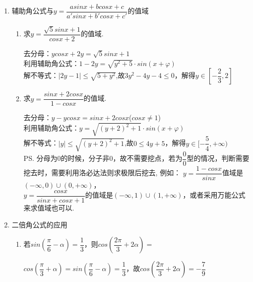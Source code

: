 \begin{enumerate}
\begin{enumerate}
\begin{jieda}
            $\Longrightarrow \dfrac{2m-3}{4-m} \in [-1, 1] 
            \Longrightarrow \left |\dfrac{2m-3}{4-m} \right| \leq 1 
            \Longrightarrow |2m-3| \leq |4-m| \Longrightarrow 4m^2 - 12m + 9 \leq 16 + m^2 - 8m \Longrightarrow 3m^2 -4m - 7 \leq 0 \Longrightarrow m \in \left[-1, \dfrac{7}{3}\right]$
        \end{jieda}
    \end{enumerate}
    \item 辅助角公式与$y = \dfrac{asinx+bcosx+c}{a'sinx+b'cosx+c'}$的值域
    \begin{enumerate}
        \item 求$y = \dfrac{\sqrt{5}sinx+1}{cosx+2}$的值域.
        \begin{jieda}
            去分母：$ycosx + 2y = \sqrt{5}sinx+1$ \\
            利用辅助角公式：$1-2y = \sqrt{y^2+5} \cdot sin(x+\varphi)$ \\
            解不等式：$|2y-1| \leq \sqrt{5+y^2}$,故$3y^2-4y-4 \leq 0$，解得$y \in [-\dfrac{2}{3}, 2]$
        \end{jieda}
        \item 求$y = \dfrac{sinx+2cosx}{1-cosx}$的值域.
        \begin{jieda}
            去分母：$y - ycosx = sinx + 2cosx$($cosx \neq 1$) \\
            利用辅助角公式：$y = \sqrt{(y+2)^2+1} \cdot sin(x+\varphi)$ \\
            解不等式：$|y| \leq \sqrt{(y+2)^2+1}$,故$0 \leq 4y+5$，解得$y \in [-\dfrac{5}{4}, +\infty)$ \\
            \ps 分母为0的时候，分子非0，故不需要挖点，若为$\dfrac{0}{0}$型的情况，判断需要挖去时，需要利用洛必达法则求极限后挖去, 例如： $y = \dfrac{1-cosx}{sinx}$值域是$(-\infty, 0) \cup (0, +\infty)$，\\
             $y = \dfrac{cos x}{sin x+cos x+1}$的值域是$(-\infty, 1) \cup (1, +\infty)$，或者采用万能公式来求值域也可以.
        \end{jieda}
    \end{enumerate}
    \item 二倍角公式的应用
    \begin{enumerate}
        \item 若$sin(\dfrac{\pi}{6} - \alpha) = \dfrac{1}{3}$，则$cos(\dfrac{2\pi}{3} + 2\alpha) = $
        \begin{jieda}
            $cos(\dfrac{\pi}{3} + \alpha) = sin(\dfrac{\pi}{6} - \alpha) = \dfrac{1}{3}$，故$cos(\dfrac{2\pi}{3} + 2\alpha) = -\dfrac{7}{9}$

\end{jieda}
\end{enumerate}
\end{enumerate}
